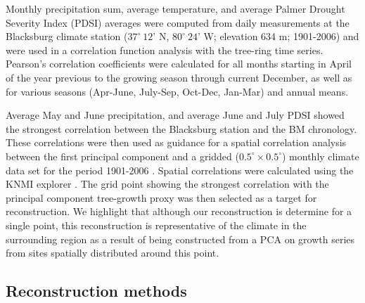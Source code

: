Monthly precipitation sum, average temperature, and average Palmer
Drought Severity Index (PDSI) \cite{palmer1965meteorological} averages
were computed from daily measurements at the Blacksburg climate station
($37^{\circ} \ 12$' N, $80^{\circ}\ 24$' W; elevation 634 m; 1901-2006)
and were used in a correlation function analysis with the tree-ring time
series. Pearson's correlation coefficients were calculated for all months
starting in April of the year previous to the growing season through
current December, as well as for various seasons (Apr-June, July-Sep,
Oct-Dec, Jan-Mar) and annual means.

Average May and June precipitation, and average June and July PDSI
showed the strongest correlation between the Blacksburg station
and the BM chronology. These correlations were then used as guidance for a spatial
correlation analysis between the first principal component and a gridded ($0.5^{\circ} \times 0.5^{\circ}$)
monthly climate data set for the period 1901-2006 \cite[CRUTS3.10;
][]{harris2014updated}. Spatial correlations were calculated using the
KNMI explorer \cite[; http://climexp.knmi.nl]{trouet2013knmi}. The grid
point showing the strongest correlation with the principal component tree-growth proxy was then
selected as a target for reconstruction. We highlight that although our reconstruction is determine for a single point, this reconstruction is representative of the climate in the surrounding region as a result of being constructed from a PCA on growth series from sites spatially distributed around this point.


\subsection{Reconstruction methods}

